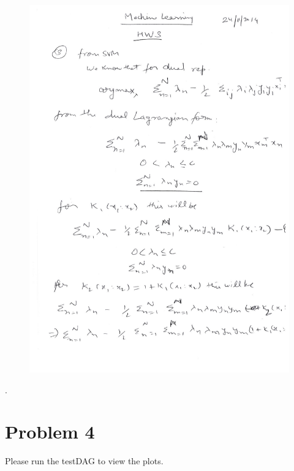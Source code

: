 \documentclass[11pt]{article}
\begin{document}
\begin{figure}[H]
	\centering
	\includegraphics[page=2,scale=0.65]{scans}
\end{figure}
.

\section{Problem 4}

Please run the testDAG to view the plots. 
\end{document}
